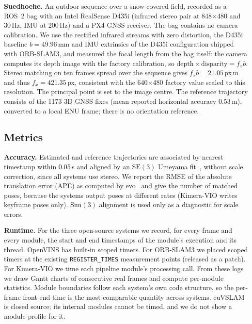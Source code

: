 \documentclass[conference,a4paper]{IEEEtran}
\newcommand{\sued}{Suedhoehe}
\newcommand{\SE}{$\mathrm{SE}(3)$}
\newcommand{\Sim}{$\mathrm{Sim}(3)$}
\begin{document}
\textbf{\sued{}.} An outdoor sequence over a snow-covered field, recorded as a ROS~2 bag with
an Intel RealSense D435i (infrared stereo pair at 848$\times$480 and 30\,Hz, IMU at 200\,Hz) and
a PX4 GNSS receiver. The bag contains no camera calibration. We use the rectified infrared
streams with zero distortion, the D435i baseline $b = 49.96$\,mm and IMU extrinsics of the
D435i configuration shipped with ORB-SLAM3, and measured the focal length from the bag itself:
the camera computes its depth image with the factory calibration, so
$\text{depth} \times \text{disparity} = f_x b$. Stereo matching on ten frames spread over the
sequence gives $f_x b = 21.05$\,px\,m and thus $f_x = 421.35$\,px, consistent with the
640$\times$480 factory value scaled to this resolution. The principal point is set to the image
centre. The reference trajectory consists of the 1173 3D GNSS fixes (mean reported horizontal
accuracy 0.53\,m), converted to a local ENU frame; there is no orientation reference.

\subsection{Metrics}

\textbf{Accuracy.} Estimated and reference trajectories are associated by nearest timestamp
within 0.05\,s and aligned by an \SE{} Umeyama fit~\cite{umeyama1991}, without scale correction,
since all systems use stereo. We report the RMSE of the absolute translation error (APE) as
computed by evo~\cite{grupp2017evo} and give the number of matched poses, because the systems
output poses at different rates (Kimera-VIO writes keyframe poses only). \Sim{} alignment is used
only as a diagnostic for scale errors.

\textbf{Runtime.} For the three open-source systems we record, for every frame and every
module, the start and end timestamps of the module's execution and its thread. OpenVINS has
built-in scoped timers. For ORB-SLAM3 we placed scoped timers at the existing
\texttt{REGISTER\_TIMES} measurement points (released as a patch). For Kimera-VIO we time each
pipeline module's processing call. From these logs we draw Gantt charts of consecutive real
frames and compute per-module statistics. Module boundaries follow each system's own code
structure, so the per-frame front-end time is the most comparable quantity across systems.
cuVSLAM is closed source; its internal modules cannot be timed, and we do not show a module
profile for it.

\end{document}
